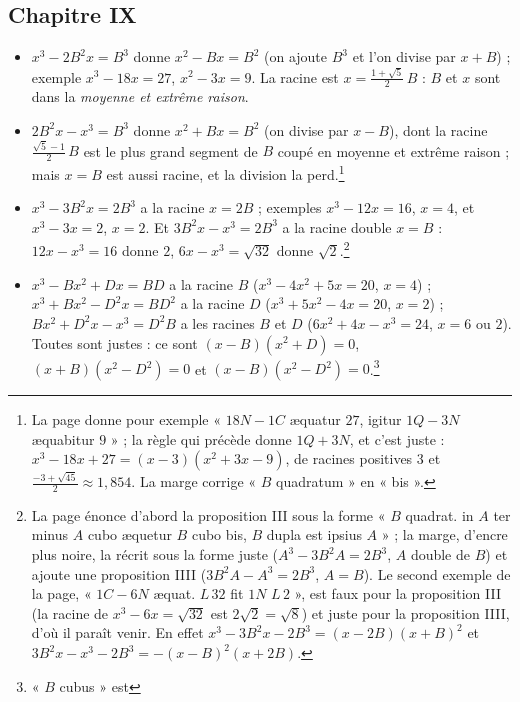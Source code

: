 \documentclass[11pt,a4paper]{article}
\begin{document}
\subsection*{Chapitre IX}

\begin{itemize}
  \item $x^3 - 2B^2x = B^3$ donne $x^2 - Bx = B^2$ (on ajoute $B^3$ et l'on divise
    par $x + B$) ; exemple $x^3 - 18x = 27$, $x^2 - 3x = 9$. La racine est
    $x = \tfrac{1 + \sqrt5}{2}\,B$ : $B$ et $x$ sont dans la \emph{moyenne et extrême
    raison}.
  \item $2B^2x - x^3 = B^3$ donne $x^2 + Bx = B^2$ (on divise par $x - B$), dont la
    racine $\tfrac{\sqrt5 - 1}{2}\,B$ est le plus grand segment de $B$ coupé en
    moyenne et extrême raison ; mais $x = B$ est aussi racine, et la division la
    perd.\footnote{La page donne pour exemple « $18N - 1C$ æquatur $27$, igitur
    $1Q - 3N$ æquabitur $9$ » ; la règle qui précède donne $1Q + 3N$, et c'est
    juste : $x^3 - 18x + 27 = (x - 3)(x^2 + 3x - 9)$, de racines positives $3$ et
    $\tfrac{-3 + \sqrt{45}}{2} \approx 1{,}854$. La marge corrige « $B$ quadratum »
    en « bis ».}
  \item $x^3 - 3B^2x = 2B^3$ a la racine $x = 2B$ ; exemples $x^3 - 12x = 16$,
    $x = 4$, et $x^3 - 3x = 2$, $x = 2$. Et $3B^2x - x^3 = 2B^3$ a la racine double
    $x = B$ : $12x - x^3 = 16$ donne $2$, $6x - x^3 = \sqrt{32}$ donne
    $\sqrt2$.\footnote{La page énonce d'abord la proposition III sous la forme
    « $B$ quadrat. in $A$ ter minus $A$ cubo æquetur $B$ cubo bis, $B$ dupla est
    ipsius $A$ » ; la marge, d'encre plus noire, la récrit sous la forme juste
    ($A^3 - 3B^2A = 2B^3$, $A$ double de $B$) et ajoute une proposition IIII
    ($3B^2A - A^3 = 2B^3$, $A = B$). Le second exemple de la page, « $1C - 6N$ æquat.
    $L\,32$ fit $1N$ $L\,2$ », est faux pour la proposition III (la racine de
    $x^3 - 6x = \sqrt{32}$ est $2\sqrt2 = \sqrt8$) et juste pour la proposition
    IIII, d'où il paraît venir. En effet $x^3 - 3B^2x - 2B^3 = (x - 2B)(x + B)^2$ et
    $3B^2x - x^3 - 2B^3 = -(x - B)^2(x + 2B)$.}
  \item $x^3 - Bx^2 + Dx = BD$ a la racine $B$ ($x^3 - 4x^2 + 5x = 20$, $x = 4$) ;
    $x^3 + Bx^2 - D^2x = BD^2$ a la racine $D$ ($x^3 + 5x^2 - 4x = 20$, $x = 2$) ;
    $Bx^2 + D^2x - x^3 = D^2B$ a les racines $B$ et $D$ ($6x^2 + 4x - x^3 = 24$,
    $x = 6$ ou $2$). Toutes sont justes : ce sont $(x - B)(x^2 + D) = 0$,
    $(x + B)(x^2 - D^2) = 0$ et $(x - B)(x^2 - D^2) = 0$.\footnote{« $B$ cubus » est
}
\end{itemize}
\end{document}

